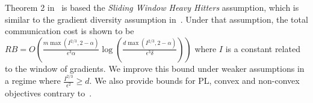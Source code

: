 \documentclass[sigconf, anonymous, review]{acmart}
\begin{document}
Theorem 2 in~\citep{rothchild2020fetchsgd} is based the \emph{Sliding Window Heavy Hitters} assumption, which is similar to the gradient diversity assumption in~\citep{li2018federated,haddadpour2019convergence}. 
Under that assumption, the total communication cost is shown to be $RB=O\left(\frac{m\max(I^{2/3},2-\alpha)}{\epsilon^3\alpha}\log\left(\frac{d\max(I^{2/3},2-\alpha)}{\epsilon^3\delta}\right)\right)$ where $I$ is a constant related to the window of gradients.
We improve this bound under weaker assumptions in a regime where $\frac{I^{2/3}}{\epsilon^2}\geq d$. 
We also provide bounds for PL, convex and non-convex objectives contrary to~\citep{rothchild2020fetchsgd}. 




 


\end{document}
